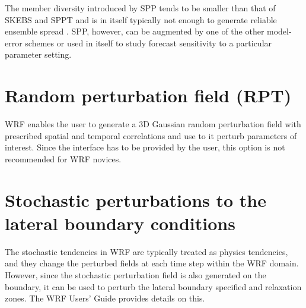The member diversity introduced by SPP tends to be smaller than that of SKEBS and SPPT 
and is in itself typically not enough to generate reliable ensemble spread 
\citep{Be15}.  SPP, however, can be augmented by one of the other model-error schemes 
or used in itself to study forecast sensitivity to a particular parameter setting.

\section {Random perturbation field (RPT)}
WRF enables the user to generate a 3D Gaussian random perturbation field
with prescribed spatial and temporal correlations and use to it perturb
parameters of interest.  Since the interface has to be provided by the
user, this option is not recommended for WRF novices.

\section {Stochastic perturbations to the lateral boundary conditions}
The stochastic tendencies in WRF are typically treated as physics tendencies, and 
they change the perturbed fields at each time step within the WRF domain. However, since 
the stochastic perturbation field is also generated on the boundary, it can be used to 
perturb the lateral boundary specified and relaxation zones. The WRF Users' Guide 
provides details on this.

